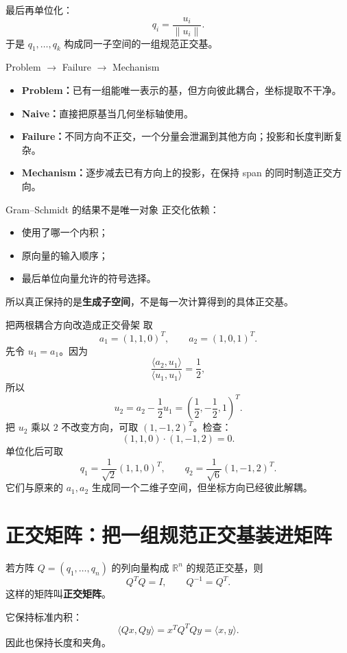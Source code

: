 \documentclass[11pt,a4paper]{ctexart}
\newcommand{\kw}[1]{\textbf{\color{deep}#1}}
\begin{document}
最后再单位化：
\[
q_i=\frac{u_i}{\|u_i\|}.
\]
于是 $q_1,\dots,q_k$ 构成同一子空间的一组规范正交基。

\begin{corebox}{Problem $\to$ Failure $\to$ Mechanism}
\begin{itemize}
  \item \kw{Problem：}已有一组能唯一表示的基，但方向彼此耦合，坐标提取不干净。
  \item \kw{Naive：}直接把原基当几何坐标轴使用。
  \item \kw{Failure：}不同方向不正交，一个分量会泄漏到其他方向；投影和长度判断复杂。
  \item \kw{Mechanism：}逐步减去已有方向上的投影，在保持 span 的同时制造正交方向。
\end{itemize}
\end{corebox}

\begin{warnbox}{Gram--Schmidt 的结果不是唯一对象}
正交化依赖：
\begin{itemize}
  \item 使用了哪一个内积；
  \item 原向量的输入顺序；
  \item 最后单位向量允许的符号选择。
\end{itemize}
所以真正保持的是\kw{生成子空间}，不是每一次计算得到的具体正交基。
\end{warnbox}

\begin{examplebox}{把两根耦合方向改造成正交骨架}
取
\[
a_1=(1,1,0)^T,\qquad a_2=(1,0,1)^T.
\]
先令 $u_1=a_1$。因为
\[
\frac{\langle a_2,u_1\rangle}{\langle u_1,u_1\rangle}
=\frac{1}{2},
\]
所以
\[
u_2=a_2-\frac12u_1
=\left(\frac12,-\frac12,1\right)^T.
\]
把 $u_2$ 乘以 $2$ 不改变方向，可取 $(1,-1,2)^T$。检查：
\[
(1,1,0)\cdot(1,-1,2)=0.
\]
单位化后可取
\[
q_1=\frac1{\sqrt2}(1,1,0)^T,
\qquad
q_2=\frac1{\sqrt6}(1,-1,2)^T.
\]
它们与原来的 $a_1,a_2$ 生成同一个二维子空间，但坐标方向已经彼此解耦。
\end{examplebox}

\section{正交矩阵：把一组规范正交基装进矩阵}

若方阵 $Q=(q_1,\dots,q_n)$ 的列向量构成 $\mathbb R^n$ 的规范正交基，则
\[
Q^TQ=I,
\qquad Q^{-1}=Q^T.
\]
这样的矩阵叫\kw{正交矩阵}。

它保持标准内积：
\[
\langle Qx,Qy\rangle=x^TQ^TQy=\langle x,y\rangle.
\]
因此也保持长度和夹角。
\end{document}

